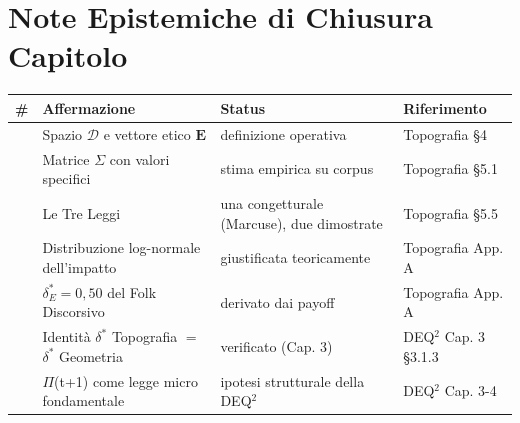 \section{Note Epistemiche di Chiusura
Capitolo}\label{note-epistemiche-di-chiusura-capitolo}

{\def\LTcaptype{none} %
{\small\begin{longtable}[]{@{}
  >{\raggedright\arraybackslash}p{}
  >{\raggedright\arraybackslash}p{}
  >{\raggedright\arraybackslash}p{}
  >{\raggedright\arraybackslash}p{}@{}}
\toprule\noalign{}
\begin{minipage}[b]{\linewidth}\raggedright
\#
\end{minipage} & \begin{minipage}[b]{\linewidth}\raggedright
Affermazione
\end{minipage} & \begin{minipage}[b]{\linewidth}\raggedright
Status
\end{minipage} & \begin{minipage}[b]{\linewidth}\raggedright
Riferimento
\end{minipage} \\
\midrule\noalign{}
\endhead
\bottomrule\noalign{}
\endlastfoot
1 & Spazio \(\mathcal{D}\) e vettore etico \(\mathbf{E}\) & \Proved{}
definizione operativa & Topografia \S{}4 \\
2 & Matrice \(\Sigma\) con valori specifici & \Proved{} stima empirica
su corpus & Topografia \S{}5.1 \\
3 & Le Tre Leggi & \Proved{} una congetturale (Marcuse), due dimostrate
& Topografia \S{}5.5 \\
4 & Distribuzione log-normale dell'impatto & \Proved{} giustificata
teoricamente & Topografia App. A \\
5 & \(\delta^*_E = 0{,}50\) del Folk Discorsivo & \Proved{} derivato dai
payoff & Topografia App. A \\
6 & Identità \(\delta^*\) Topografia \(=\) \(\delta^*\) Geometria &
\Proved{} verificato (Cap. 3) & DEQ$^2$ Cap. 3 \S{}3.1.3 \\
7 & $\Pi$(t+1) come legge micro fondamentale & \Hypoth{} ipotesi strutturale
della DEQ$^2$ & DEQ$^2$ Cap. 3-4 \\
\end{longtable}}
}



